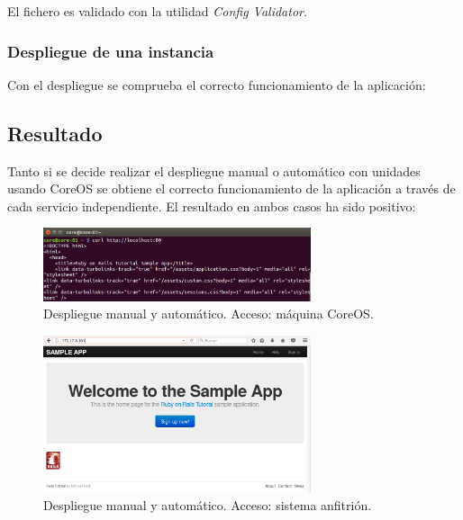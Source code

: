 El fichero es validado con la utilidad \textit{Config Validator}. 

\subsubsection{Despliegue de una instancia}

Con el despliegue se comprueba el correcto funcionamiento de la aplicación:


\subsection{Resultado}
Tanto si se decide realizar el despliegue manual o automático con unidades usando CoreOS se obtiene el correcto funcionamiento de la aplicación a través de cada servicio independiente.
El resultado en ambos casos ha sido positivo:

\begin{figure}[H]
\centering
\includegraphics[width=0.7\textwidth]{images/figures/coreosmanualcurl.png}
\caption{Despliegue manual y automático. Acceso: máquina CoreOS.}
\end{figure}

\begin{figure}[H]
\centering
\includegraphics[width=0.7\textwidth]{images/figures/coreosmanualhost.png}
\caption{Despliegue manual y automático. Acceso: sistema anfitrión.}
\end{figure}

